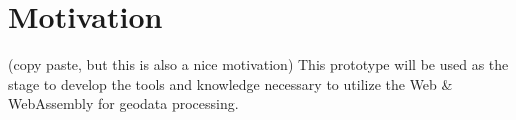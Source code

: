 \newpage
\section{Motivation}

(copy paste, but this is also a nice motivation)
This prototype will be used as the stage to develop the tools and knowledge necessary to utilize the Web \& WebAssembly for geodata processing.   
